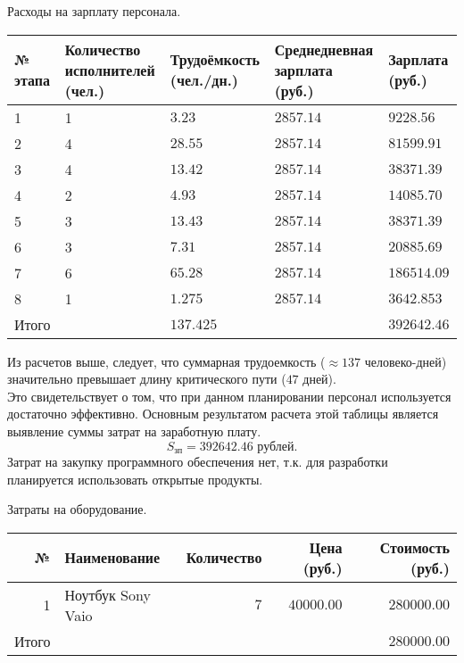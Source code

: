 \begin{dsmalltable}{Расходы на зарплату персонала.}
	\begin{tabular}{|m{1cm}|m{3cm}|m{3cm}|m{3cm}|m{3cm}|}
		\hline
			№ этапа 
				& Количество исполнителей (чел.)
				& Трудоёмкость (чел./дн.) 
				& Среднедневная зарплата (руб.)
				& Зарплата (руб.) \\
		\hline
			1 & 1 &  $3.23$ & $2857.14$ &  $9228.56$ \\
		\hline
			2 & 4 & $28.55$ & $2857.14$ &  $81599.91$ \\
		\hline
			3 & 4 & $13.42$ & $2857.14$ &  $38371.39$ \\
		\hline
			4 & 2 &  $4.93$ & $2857.14$ &  $14085.70$ \\
		\hline
			5 & 3 & $13.43$ & $2857.14$ &  $38371.39$ \\
		\hline
			6 & 3 &  $7.31$ & $2857.14$ &  $20885.69$ \\
		\hline
			7 & 6 & $65.28$ & $2857.14$ &  $186514.09$ \\
		\hline
			8 & 1 & $1.275$ & $2857.14$ &  $3642.853$ \\
		\hline
	Итого &       & $137.425$ &		    &  $392642.46$  \\
		\hline
	\end{tabular} 
\end{dsmalltable}

Из расчетов выше, следует, что суммарная трудоемкость 
($\approx 137$ человеко-дней) значительно превышает длину критического пути ($47$ дней). \\
Это свидетельствует о том, что при данном планировании персонал используется достаточно эффективно.
Основным результатом расчета этой таблицы является выявление суммы затрат на заработную плату.
\[
	S_{\text{зп}} = 392642.46 \text{ рублей}.
\]
Затрат на закупку программного обеспечения нет, 
т.к. для разработки
планируется использовать открытые продукты.

\begin{dtable}{Затраты на оборудование.}
	\begin{tabular}{|r|p{4cm}|r|r|r|}
		\hline
				№ 
				& Наименование
				& Количество
				& Цена (руб.)
				& Стоимость (руб.) \\
		\hline
			1 & Ноутбук Sony Vaio &  $7$ & $40000.00$   &    $280000.00$ \\
		\hline
	Итого &     							& 	  &  					  &   $280000.00$  \\
		\hline
	\end{tabular} 
\end{dtable}

